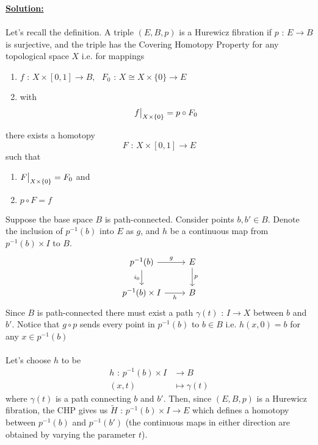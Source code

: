 \documentclass[11pt]{article}
\begin{document}
\vskip 0.5cm
\textbf{\underline{Solution:}}
\\
\\
Let's recall the definition. A triple $(E, B, p)$ is a Hurewicz fibration if  $p \text{ : } E \rightarrow B$ is surjective, and the triple has the Covering Homotopy Property for any topological space $X$ i.e. for mappings
\begin{enumerate}
  \item $f \text{ : } X \times [0, 1] \rightarrow B, ~~~F_0 \text{ : } X \cong X \times \{0\} \rightarrow E $
  \item with $$ \restr{f}{X \times \{0\}} = p \circ F_0 $$
\end{enumerate} there exists a homotopy 
$$ F \text{ : } X \times [0, 1] \rightarrow E $$ such that 
\begin{enumerate}
  \item $ \restr{F}{X \times \{0\}} = F_0 $ and 
  \item $p \circ F = f$
\end{enumerate} Suppose the base space $B$ is path-connected. Consider points $b, b' \in B$. Denote the inclusion of $p^{-1}(b)$ into $E$ as $g$, and $h$ be a continuous map from $p^{-1}(b) \times I$ to $B$.  \[\begin{tikzcd}
	{p^{-1}(b)} & E \\
	{p^{-1}(b) \times I} & B
	\arrow["g", from=1-1, to=1-2]
	\arrow["{i_0}"', from=1-1, to=2-1]
	\arrow["p", from=1-2, to=2-2]
	\arrow["h"', from=2-1, to=2-2]
\end{tikzcd}\] Since $B$ is path-connected there must exist a path $\gamma(t) \text{ : } I \rightarrow X$ between $b$ and $b'$. Notice that $g \circ p$ sends every point in $p^{-1}(b)$ to $b \in B$ i.e. $h(x, 0) = b$ for any $x \in p^{-1}(b)$
\\
\\
Let's choose $h$ to be
\begin{align*}
  h \text{ : } p^{-1}(b) \times I &\rightarrow B \\
              (x, t) &\mapsto \gamma(t)
\end{align*} where $\gamma(t)$ is a path connecting $b$ and $b'$. Then, since $(E, B, p)$ is a Hurewicz fibration, the CHP gives us $\tilde{H} \text{ : } p^{-1}(b) \times I \rightarrow E$ which defines a homotopy between $p^{-1}(b)$ and $p^{-1}(b')$ (the continuous maps in either direction are obtained by varying the parameter $t$).




\end{document}
